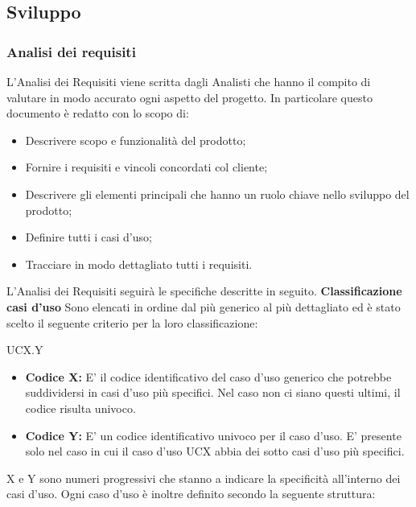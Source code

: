 \subsection{Sviluppo}
    \subsubsection{Analisi dei requisiti}
    	L'Analisi dei Requisiti viene scritta dagli Analisti che hanno il compito di valutare in modo accurato ogni aspetto del progetto. In particolare questo documento è redatto con lo scopo di:
	    \begin{itemize}
	    	\item Descrivere scopo e funzionalità del prodotto;
	    	\item Fornire i requisiti e vincoli concordati col cliente;
	    	\item Descrivere gli elementi principali che hanno un ruolo chiave nello sviluppo del prodotto;
	    	\item Definire tutti i casi d'uso;
	    	\item Tracciare in modo dettagliato tutti i requisiti.\newline
	    \end{itemize}
    	L'Analisi dei Requisiti seguirà le specifiche descritte in seguito.\newline \newline
    	\textbf{Classificazione casi d'uso} Sono elencati in ordine dal più generico al più dettagliato ed è stato scelto il seguente criterio per la loro classificazione: \newline
	    \begin{center}
	    	UCX.Y
	    \end{center}
	    \begin{itemize}
	    	\item \textbf{Codice X:} E' il codice identificativo del caso d'uso generico che potrebbe suddividersi
	    	in casi d'uso più specifici. Nel caso non ci siano questi ultimi, il codice risulta univoco.
	    	\item \textbf{Codice Y:} E' un codice identificativo univoco per il caso d'uso. E' presente solo nel
	    	caso in cui il caso d'uso UCX abbia dei sotto casi d'uso più specifici.
	    \end{itemize}
	    X e Y sono numeri progressivi che stanno a indicare la specificità all'interno dei casi d'uso.\newline
	    Ogni caso d'uso è inoltre definito secondo la seguente struttura:\newline
